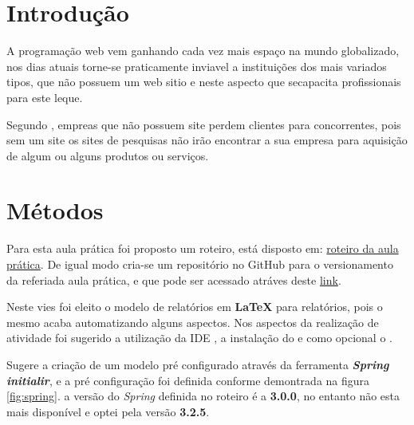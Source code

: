
\section{Introdução}

\par A programação web vem ganhando cada vez mais espaço na mundo globalizado, nos dias atuais torne-se praticamente inviavel a instituições dos mais variados tipos, que não possuem um web sitio e neste aspecto que secapacita profissionais para este leque.
\par Segundo , empreas que não possuem site perdem clientes para concorrentes, pois sem um site os sites de pesquisas não irão encontrar a sua empresa para aquisição de algum ou alguns produtos ou serviços.




\section{Métodos}
\par Para esta aula prática foi proposto um roteiro, está disposto em: \href {https://github.com/ENGENHARIA-DE-SOFTWARE-UNOPAR/web-project/blob/main/Roteiro%20aula%20pr%C3%A1tica.pdf} {roteiro da aula prática}. De igual modo cria-se um repositório no GitHub para o versionamento da referiada aula prática, e que pode ser acessado atráves deste \href {https://github.com/ENGENHARIA-DE-SOFTWARE-UNOPAR/web-project} {link}.
\par Neste vies foi eleito o modelo de relatórios em \textbf{LaTeX} para relatórios, pois o mesmo acaba automatizando alguns aspectos. Nos aspectos da realização de atividade foi sugerido a utilização da IDE , a instalação do  e como opcional o .
\par Sugere a criação de um modelo pré configurado através da ferramenta \textit{\textbf{Spring initialir}}, e a pré configuração foi definida conforme demontrada na figura \ref{fig:spring}. a versão do \textit{Spring} definida no roteiro é a \textbf{3.0.0}, no entanto não esta mais disponível e optei pela versão \textbf{3.2.5}.


